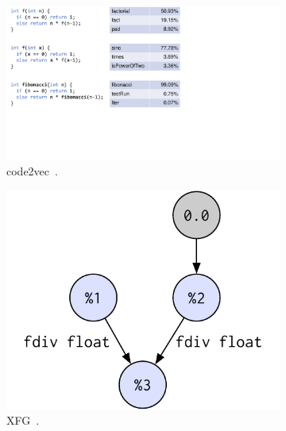 \begin{figure}[t]
  \centering
    \begin{subfigure}{.48\linewidth}
      \includegraphics[width=\linewidth]{images/code2vec-transposed.pdf}
      \caption{code2vec~\cite{Alon2018a}.}
      \label{subfig:code2vec}
  \end{subfigure}
  \hfill
  \begin{subfigure}{.29\linewidth}
    \vspace{2.5em}
      \includegraphics[width=\linewidth]{images/inst2vec.pdf}
      \caption{XFG~\cite{Ben-nun2018}.}
      \label{subfig:inst2vec}
  \end{subfigure}
  \hfill
  \begin{subfigure}{.18\linewidth}
  \vspace{2.4em}

\end{subfigure}
\end{figure}
